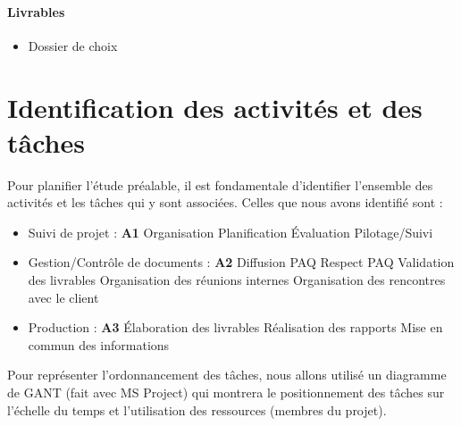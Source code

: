 \paragraph{Livrables}
\begin{itemize}
    \item Dossier de choix
\end{itemize}

\section{Identification des activités et des tâches}

Pour planifier l’étude préalable, il est fondamentale d’identifier l’ensemble des activités et les tâches qui y sont associées. Celles que nous avons identifié sont :
\begin{itemize}
    \item Suivi de projet : {\bf A1}
        \subitem Organisation
        \subitem Planification
        \subitem Évaluation
        \subitem Pilotage/Suivi

    \item Gestion/Contrôle de documents : {\bf A2}
        \subitem Diffusion PAQ
        \subitem Respect PAQ
        \subitem Validation des livrables
        \subitem Organisation des réunions internes
        \subitem Organisation des rencontres avec le client

    \item Production : {\bf A3}
        \subitem Élaboration des livrables
        \subitem Réalisation des rapports
        \subitem Mise en commun des informations
\end{itemize}

Pour représenter l’ordonnancement des tâches, nous allons utilisé un diagramme de GANT (fait avec MS Project) qui montrera le positionnement des tâches sur l’échelle du temps et l’utilisation des ressources (membres du projet).



